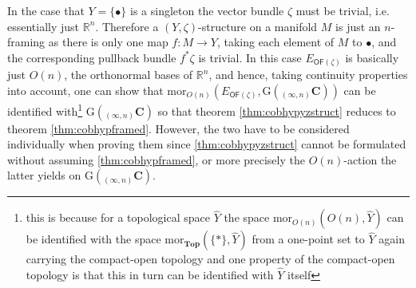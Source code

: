In the case that $Y = \lbrace \bullet \rbrace$ is a singleton the vector bundle $\zeta$ must be trivial, i.e. essentially just $\mathbb{R}^{n}$. Therefore a $(Y,\zeta)$-structure on a manifold $M$ is just an $n$-framing as there is only one map $f \colon M \to Y$, taking each element of $M$ to $\bullet$, and the corresponding pullback bundle $f^{\ast}\zeta$ is trivial. In this case $E_{\mathsf{OF}(\zeta)}$ is basically just $O(n)$, the orthonormal bases of $\mathbb{R}^{n}$, and hence, taking continuity properties into account, one can show that $\mathrm{mor}_{O(n)}(E_{\mathsf{OF}(\zeta)},\mathrm{G}({_{(\infty,n)}}\mathbf{C}))$ can be identified with\footnote{this is because for a topological space $\hat{Y}$ the space $\mathrm{mor}_{O(n)}(O(n),\hat{Y})$ can be identified with the space $\mathrm{mor}_{\mathbf{Top}}(\lbrace \ast \rbrace,\hat{Y})$ from a one-point set to $\hat{Y}$ again carrying the compact-open topology and one property of the compact-open topology is that this in turn can be identified with $\hat{Y}$ itself} $\mathrm{G}({_{(\infty,n)}}\mathbf{C})$ so that theorem \ref{thm:cobhypyzstruct} reduces to theorem \ref{thm:cobhypframed}. However, the two have to be considered individually when proving them since \ref{thm:cobhypyzstruct} cannot be formulated without assuming \ref{thm:cobhypframed}, or more precisely the $O(n)$-action the latter yields on $\mathrm{G}({_{(\infty,n)}}\mathbf{C})$.
